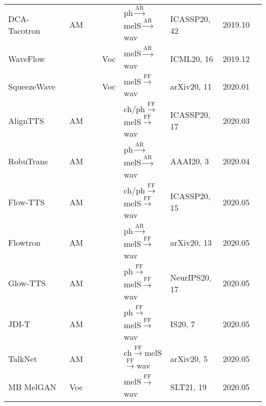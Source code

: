 \documentclass{article}
\begin{document}
\begin{center}
\begin{longtable}{l | l | l | l | l | l }
		DCA-Tacotron~\cite{battenberg2020location}               & AM     &  {\color{blue}ph}$\stackrel{\text{AR}}{\longrightarrow}${\color{red}melS}$\stackrel{\text{AR}}{\longrightarrow}$wav               & ICASSP20, 42 & 2019.10  \\
		WaveFlow~\cite{ping2020waveflow}               & ~~~~~~~~Voc      & {\color{red}melS}$\stackrel{\text{AR}}{\longrightarrow}$wav   & ICML20, 16 &2019.12        \\
		SqueezeWave~\cite{zhai2020squeezewave}            & ~~~~~~~~Voc      & {\color{red}melS}$\stackrel{\text{FF}}{\longrightarrow}$wav          &arXiv20, 11& 2020.01  &        \\
		AlignTTS~\cite{zeng2020aligntts}               & AM     &  {\color{blue}ch/ph}$\stackrel{\text{FF}}{\longrightarrow}${\color{red}melS}$\stackrel{\text{FF}}{\longrightarrow}$wav               & ICASSP20, 17 & 2020.03         \\
		RobuTrans~\cite{li2020robutrans}              & AM     &  {\color{blue}ph}$\stackrel{\text{AR}}{\longrightarrow}${\color{red}melS}$\stackrel{\text{AR}}{\longrightarrow}$wav               & AAAI20, 3 & 2020.04         \\
		Flow-TTS~\cite{miao2020flow}               & AM   &    {\color{blue}ch/ph}$\stackrel{\text{FF}}{\longrightarrow}${\color{red}melS}$\stackrel{\text{FF}}{\longrightarrow}$wav               & ICASSP20, 15 & 2020.05        \\
		Flowtron~\cite{valle2020flowtron}               & AM       &   {\color{blue}ph}$\stackrel{\text{AR}}{\longrightarrow}${\color{red}melS}$\stackrel{\text{FF}}{\longrightarrow}$wav     &arXiv20, 13& 2020.05         \\
		Glow-TTS~\cite{kim2020glow}               & AM       & {\color{blue}ph}$\stackrel{\text{FF}}{\longrightarrow}${\color{red}melS}$\stackrel{\text{FF}}{\longrightarrow}$wav               & NeurIPS20, 17& 2020.05        \\
		JDI-T~\cite{lim2020jdi}                  & AM       &  {\color{blue}ph}$\stackrel{\text{FF}}{\longrightarrow}${\color{red}melS}$\stackrel{\text{FF}}{\longrightarrow}$wav             &IS20, 7& 2020.05     \\
		TalkNet~\cite{beliaev2020talknet}                  & AM       &  {\color{blue}ch}$\stackrel{\text{FF}}{\longrightarrow}${\color{red}melS}$\stackrel{\text{FF}}{\longrightarrow}$wav             &arXiv20, 5& 2020.05     \\
		MB MelGAN~\cite{yang2020multi}      & Voc      & {\color{red}melS}$\stackrel{\text{FF}}{\longrightarrow}$wav   & SLT21, 19 & 2020.05        \\

\end{longtable}
\end{center}
\end{document}
